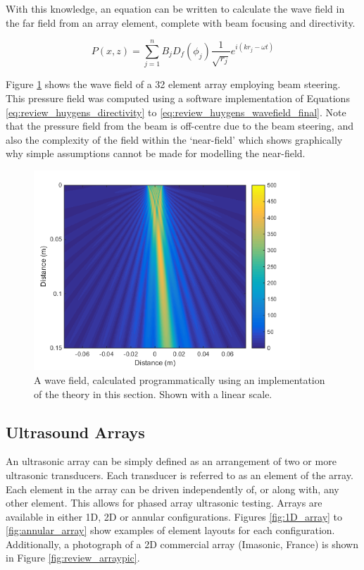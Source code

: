 With this knowledge, an equation can be written to calculate the wave field in the far field from an array element, complete with beam focusing and directivity.

\begin{equation} \label{eq:review_huygens_wavefield_final}
P(x,z) = \sum_{j=1}^{n} B_j D_f(\phi_j) \frac{1}{\sqrt{r_j}} e^{i(kr_j - \omega t)}
\end{equation}

Figure \ref{fig:review_huygens} shows the wave field of a 32 element array employing beam steering. This pressure field was computed using a software implementation of Equations \ref{eq:review_huygens_directivity} to \ref{eq:review_huygens_wavefield_final}. Note that the pressure field from the beam is off-centre due to the beam steering, and also the complexity of the field within the `near-field' which shows graphically why simple assumptions cannot be made for modelling the near-field.

\begin{figure}[ht]
\centering
		\includegraphics[width=10cm]{WaveField3.png}
		\caption{A wave field, calculated programmatically using an implementation of the theory in this section. Shown with a linear scale.}
		\label{fig:review_huygens}
\end{figure}

\subsection{Ultrasound Arrays}

An ultrasonic array can be simply defined as an arrangement of two or more ultrasonic transducers\cite{thurstone_ultrasonic_1965}. Each transducer is referred to as an element of the array. Each element in the array can be driven independently of, or along with, any other element. This allows for phased array ultrasonic testing. Arrays are available in either 1D, 2D or annular configurations. Figures \ref{fig:1D_array} to \ref{fig:annular_array} show examples of element layouts for each configuration. Additionally, a photograph of a 2D commercial array (Imasonic, France) is shown in Figure \ref{fig:review_arraypic}.

